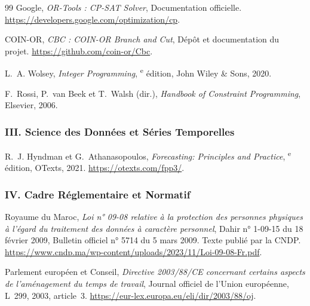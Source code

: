 \begin{thebibliography}{99}
Google,
\newblock \emph{OR-Tools : CP-SAT Solver},
\newblock Documentation officielle.
\newblock \url{https://developers.google.com/optimization/cp}.

COIN-OR,
\newblock \emph{CBC : COIN-OR Branch and Cut},
\newblock Dépôt et documentation du projet.
\newblock \url{https://github.com/coin-or/Cbc}.

L.~A. Wolsey,
\newblock \emph{Integer Programming},
\textsuperscript{e} édition, John Wiley \& Sons, 2020.

F.~Rossi, P.~van Beek et T.~Walsh (dir.),
\newblock \emph{Handbook of Constraint Programming},
\newblock Elsevier, 2006.

\subsubsection*{III. Science des Données et Séries Temporelles}

R.~J. Hyndman et G.~Athanasopoulos,
\newblock \emph{Forecasting: Principles and Practice},
\textsuperscript{e} édition, OTexts, 2021.
\newblock \url{https://otexts.com/fpp3/}.

\subsubsection*{IV. Cadre Réglementaire et Normatif}

Royaume du Maroc,
\newblock \emph{Loi n° 09-08 relative à la protection des personnes physiques à l'égard du traitement des données à caractère personnel},
\newblock Dahir n° 1-09-15 du 18 février 2009, Bulletin officiel n° 5714 du 5 mars 2009. Texte publié par la CNDP.
\newblock \url{https://www.cndp.ma/wp-content/uploads/2023/11/Loi-09-08-Fr.pdf}.

Parlement européen et Conseil,
\newblock \emph{Directive 2003/88/CE concernant certains aspects de l'aménagement du temps de travail},
\newblock Journal officiel de l'Union européenne, L~299, 2003, article~3.
\newblock \url{https://eur-lex.europa.eu/eli/dir/2003/88/oj}.


\end{thebibliography}
